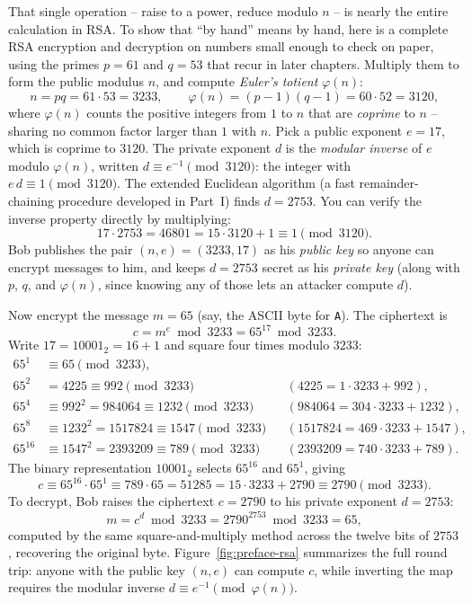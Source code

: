 That single operation -- raise to a power, reduce modulo $n$ -- is nearly the entire calculation in RSA. To show that ``by hand'' means by hand, here is a complete RSA encryption and decryption on numbers small enough to check on paper, using the primes $p = 61$ and $q = 53$ that recur in later chapters. Multiply them to form the public modulus $n$, and compute \emph{Euler's totient} $\varphi(n)$:
\[
  n = pq = 61 \cdot 53 = 3233, \qquad
  \varphi(n) = (p - 1)(q - 1) = 60 \cdot 52 = 3120,
\]
where $\varphi(n)$ counts the positive integers from $1$ to $n$ that are \emph{coprime} to $n$ -- sharing no common factor larger than $1$ with $n$. Pick a public exponent $e = 17$, which is coprime to $3120$. The private exponent $d$ is the \emph{modular inverse} of $e$ modulo $\varphi(n)$, written $d \equiv e^{-1} \pmod{3120}$: the integer with $e\,d \equiv 1 \pmod{3120}$. The extended Euclidean algorithm (a fast remainder-chaining procedure developed in Part~I) finds $d = 2753$. You can verify the inverse property directly by multiplying:
\[
  17 \cdot 2753 = 46801 = 15 \cdot 3120 + 1 \equiv 1 \pmod{3120}.
\]
Bob publishes the pair $(n, e) = (3233, 17)$ as his \emph{public key} so anyone can encrypt messages to him, and keeps $d = 2753$ secret as his \emph{private key} (along with $p$, $q$, and $\varphi(n)$, since knowing any of those lets an attacker compute $d$).

Now encrypt the message $m = 65$ (say, the ASCII byte for \texttt{A}). The ciphertext is
\[
  c = m^{e} \bmod 3233 = 65^{17} \bmod 3233.
\]
Write $17 = 10001_2 = 16 + 1$ and square four times modulo $3233$:
\begin{align*}
  65^{1} &\equiv 65 \pmod{3233}, \\
  65^{2} &= 4225 \equiv 992 \pmod{3233} && (4225 = 1 \cdot 3233 + 992), \\
  65^{4} &\equiv 992^{2} = 984064 \equiv 1232 \pmod{3233} && (984064 = 304 \cdot 3233 + 1232), \\
  65^{8} &\equiv 1232^{2} = 1517824 \equiv 1547 \pmod{3233} && (1517824 = 469 \cdot 3233 + 1547), \\
  65^{16} &\equiv 1547^{2} = 2393209 \equiv 789 \pmod{3233} && (2393209 = 740 \cdot 3233 + 789).
\end{align*}
The binary representation $10001_2$ selects $65^{16}$ and $65^1$, giving
\[
  c \equiv 65^{16} \cdot 65^{1} \equiv 789 \cdot 65 = 51285 = 15 \cdot 3233 + 2790 \equiv 2790 \pmod{3233}.
\]
To decrypt, Bob raises the ciphertext $c = 2790$ to his private exponent $d = 2753$:
\[
  m = c^{d} \bmod 3233 = 2790^{2753} \bmod 3233 = 65,
\]
computed by the same square-and-multiply method across the twelve bits of $2753$, recovering the original byte. Figure~\ref{fig:preface-rsa} summarizes the full round trip: anyone with the public key $(n, e)$ can compute $c$, while inverting the map requires the modular inverse $d \equiv e^{-1} \pmod{\varphi(n)}$.

